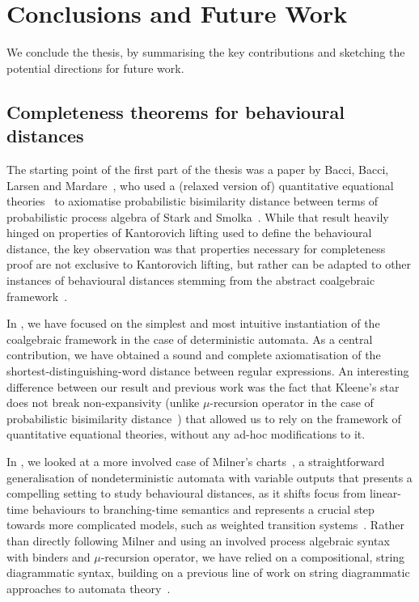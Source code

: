 \chapter{Conclusions and Future Work}
\label{chapterlabel4}
We conclude the thesis, by summarising the key contributions and sketching the potential directions for future work.
\section{Completeness theorems for behavioural distances}
The starting point of the first part of the thesis was a paper by Bacci, Bacci, Larsen and Mardare~\cite{Bacci:2018:Bisimilarity}, who used a (relaxed version of) quantitative equational theories~\cite{Mardare:2016:Quantitative} to axiomatise probabilistic bisimilarity distance between terms of probabilistic process algebra of Stark and Smolka~\cite{Stark:2000:Complete}. While that result heavily hinged on properties of Kantorovich lifting used to define the behavioural distance, the key observation was that properties necessary for completeness proof are not exclusive to Kantorovich lifting, but rather can be adapted to other instances of behavioural distances stemming from the abstract coalgebraic framework~\cite{Baldan:2018:Coalgebraic}. 

In , we have focused on the simplest and most intuitive instantiation of the coalgebraic framework in the case of deterministic automata. As a central contribution, we have obtained a sound and complete axiomatisation of the shortest-distinguishing-word distance between regular expressions. An interesting difference between our result and previous work was the fact that Kleene's star does not break non-expansivity (unlike $\mu$-recursion operator in the case of probabilistic bisimilarity distance~\cite{Bacci:2018:Bisimilarity}) that allowed us to rely on the framework of quantitative equational theories, without any ad-hoc modifications to it.

In , we looked at a more involved case of Milner's charts~\cite{Milner:1984:Complete}, a straightforward generalisation of nondeterministic automata with variable outputs that presents a compelling setting to study behavioural distances, as it shifts focus from linear-time behaviours to branching-time semantics and represents a crucial step towards more complicated models, such as weighted transition systems~\cite{Larsen:2011:Metrics}. Rather than directly following Milner and using an involved process algebraic syntax with binders and $\mu$-recursion operator, we have relied on a compositional, string diagrammatic syntax, building on a previous line of work on string diagrammatic approaches to automata theory~\cite{Piedeleu:2024:Complete,antoinecsl2025}. 

